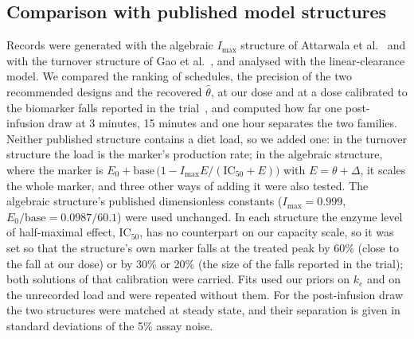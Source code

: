 \documentclass[11pt]{article}
\begin{document}
\subsection*{Comparison with published model structures}\label{sec:structures}
Records were generated with the algebraic $I_{\max}$ structure of Attarwala et
al.~\cite{pkpd_translational} and with the turnover structure of Gao et
al.~\cite{gao2025acop}, and analysed with the linear-clearance model. We compared the
ranking of schedules, the precision of the two recommended designs and the recovered $\hat\theta$,
at our dose and at a dose calibrated to the biomarker falls reported in the
trial~\cite{trial_phase12}, and computed how far one post-infusion draw at 3 minutes, 15 minutes
and one hour separates the two families.
Neither published structure contains a diet load, so we added one: in the turnover structure the
load is the marker's production rate; in the algebraic structure, where the marker is
$E_0+\mathrm{base}\,\bigl(1-I_{\max}E/(\mathrm{IC}_{50}+E)\bigr)$ with $E=\theta+\Delta$, it scales
the whole marker, and three other ways of adding it were also tested. The algebraic structure's
published dimensionless constants ($I_{\max}=0.999$, $E_0/\mathrm{base}=0.0987/60.1$) were used
unchanged. In each structure the enzyme level of half-maximal effect, $\mathrm{IC}_{50}$, has no
counterpart on our capacity scale, so it was set so that the structure's own marker falls at the
treated peak by 60\% (close to the fall at our dose) or by 30\% or 20\% (the size of the falls
reported in the trial); both solutions of that calibration were carried. Fits used our priors on
$k_e$ and on the unrecorded load and were repeated without them. For the post-infusion draw the
two structures were matched at steady state, and their separation is given in standard
deviations of the 5\% assay noise.
\end{document}
